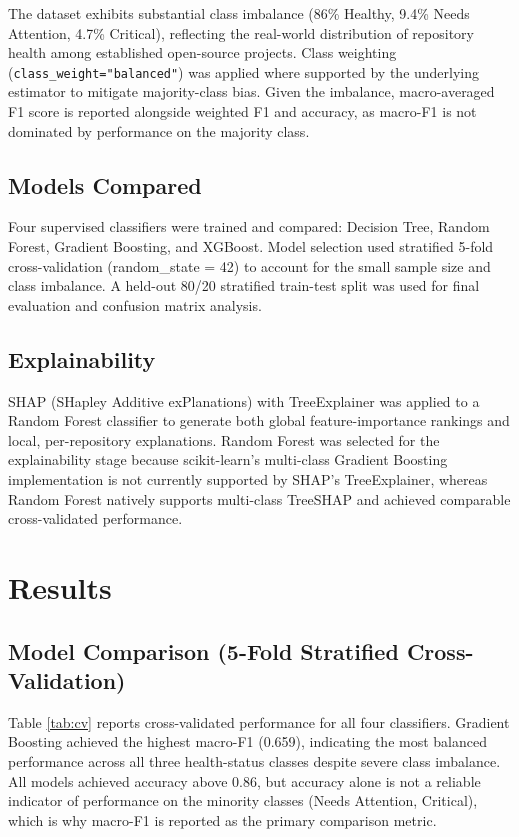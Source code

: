 \documentclass[conference]{IEEEtran}
\begin{document}
The dataset exhibits substantial class imbalance (86\% Healthy, 9.4\% Needs Attention,
4.7\% Critical), reflecting the real-world distribution of repository health among
established open-source projects. Class weighting (\texttt{class\_weight="balanced"}) was
applied where supported by the underlying estimator to mitigate majority-class bias.
Given the imbalance, macro-averaged F1 score is reported alongside weighted F1 and
accuracy, as macro-F1 is not dominated by performance on the majority class.

\subsection{Models Compared}

Four supervised classifiers were trained and compared: Decision Tree, Random Forest,
Gradient Boosting, and XGBoost. Model selection used stratified 5-fold cross-validation
(random\_state = 42) to account for the small sample size and class imbalance. A held-out
80/20 stratified train-test split was used for final evaluation and confusion matrix
analysis.

\subsection{Explainability}

SHAP (SHapley Additive exPlanations) with TreeExplainer was applied to a Random Forest
classifier to generate both global feature-importance rankings and local, per-repository
explanations. Random Forest was selected for the explainability stage because
scikit-learn's multi-class Gradient Boosting implementation is not currently supported by
SHAP's TreeExplainer, whereas Random Forest natively supports multi-class TreeSHAP and
achieved comparable cross-validated performance.

\section{Results}

\subsection{Model Comparison (5-Fold Stratified Cross-Validation)}

Table \ref{tab:cv} reports cross-validated performance for all four classifiers.
Gradient Boosting achieved the highest macro-F1 (0.659), indicating the most balanced
performance across all three health-status classes despite severe class imbalance. All
models achieved accuracy above 0.86, but accuracy alone is not a reliable indicator of
performance on the minority classes (Needs Attention, Critical), which is why macro-F1
is reported as the primary comparison metric.
\end{document}
